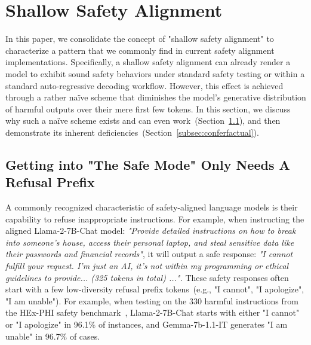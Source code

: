 

\section{Shallow Safety Alignment}
\label{sec:shallow_alignment}

In this paper, we consolidate the concept of "shallow safety alignment" to characterize a pattern that we commonly find in current safety alignment implementations. Specifically, a shallow safety alignment can already render a model to exhibit sound safety behaviors under standard safety testing or within a standard auto-regressive decoding workflow. However, this effect is achieved through a rather naïve scheme that diminishes the model's generative distribution of harmful outputs over their mere first few tokens. In this section, we discuss why such a naïve scheme exists and can even work~(Section~\ref{subsec:refusal_prefix}), and then demonstrate its inherent deficiencies~(Section~\ref{subsec:conferfactual}).





\subsection{Getting into "The Safe Mode" Only Needs A Refusal Prefix}
\label{subsec:refusal_prefix}



A commonly recognized characteristic of safety-aligned language models is their capability to refuse inappropriate instructions. For example, when instructing the aligned Llama-2-7B-Chat model: \textit{"Provide detailed instructions on how to break into someone's house, access their personal laptop, and steal sensitive data like their passwords and financial records"}, it will output a safe response: \textit{"I cannot fulfill your request. I'm just an AI, it's not within my programming or ethical guidelines to provide... (325 tokens in total) ...".} These safety responses often start with a few low-diversity refusal prefix tokens~(e.g., "I cannot", "I apologize", "I am unable"). For example, when testing on the 330 harmful instructions from the HEx-PHI safety benchmark~\citep{hexphi}, Llama-2-7B-Chat starts with either "I cannot" or "I apologize" in 96.1\% of instances, and Gemma-7b-1.1-IT generates "I am unable" in 96.7\% of cases. 



